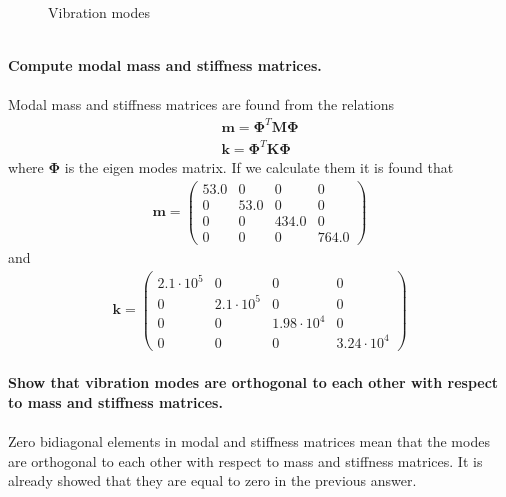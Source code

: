 \documentclass[]{report}
\begin{document}
\begin{figure}[h!]
\centering

\caption{Vibration modes}
\label{fig:allmodes}
\end{figure}
\newpage
~\\
\textbf{Compute modal mass and stiffness matrices.}
\\~\\
Modal mass and stiffness matrices are found from the relations
\begin{eqnarray*}
\mathbf{m}=\mathbf{\Phi}^T \mathbf{M} \mathbf{\Phi} \\
\mathbf{k}=\mathbf{\Phi}^T \mathbf{K} \mathbf{\Phi}
\end{eqnarray*}
where $\mathbf{\Phi}$ is the eigen modes matrix. If we calculate them it is found that
\begin{eqnarray*}
\mathbf{m}=\left(\begin{array}{cccc} 53.0 & 0 & 0 & 0\\ 0 & 53.0 & 0 & 0\\ 0 & 0 & 434.0 & 0\\ 0 & 0 & 0 & 764.0 \end{array}\right)
\end{eqnarray*}
and
\begin{eqnarray*}
\mathbf{k}=\left(\begin{array}{cccc} 2.1\cdot 10^5 & 0 & 0 & 0\\ 0 & 2.1\cdot 10^5 & 0 & 0\\ 0 & 0 & 1.98\cdot 10^4 & 0\\ 0 & 0 & 0 & 3.24\cdot 10^4 \end{array}\right)
\end{eqnarray*}
\newpage
~\\
\textbf{Show that vibration modes are orthogonal to each other with respect to mass and stiffness matrices.}
\\~\\
Zero bidiagonal elements in modal and stiffness matrices mean that the modes are orthogonal to each other with respect to mass and stiffness matrices. It is already showed that they are equal to zero in the previous answer.
\end{document}
